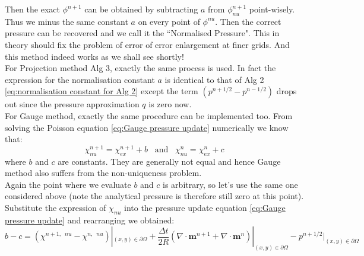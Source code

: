 Then the exact $\phi^{n+1}$ can be obtained by subtracting $a$ from $\phi^{n+1}_{nu}$ point-wisely. Thus we minus the same constant $a$ on every point of $\phi^{nu}$. Then the correct pressure can be recovered and we call it the ``Normalised Pressure". This in theory should fix the problem of error of error enlargement at finer grids. And this method indeed works as we shall see shortly!\\

For Projection method Alg 3, exactly the same process is used. In fact the expression for the normalisation constant $a$ is identical to that of Alg 2 \eqref{eq:normalisation constant for Alg 2} except the term $(p^{n+1/2} - p^{n-1/2})$ drops out since the pressure approximation $q$ is zero now.\\

For Gauge method, exactly the same procedure can be implemented too. From solving the Poisson equation \eqref{eq:Gauge pressure update} numerically we know that:
\begin{equation}
\chi^{n+1}_{nu} = \chi^{n+1}_{ex} + b\,\,\,\text{ and }\,\,\,\chi^{n}_{nu} = \chi^n_{ex} + c
\end{equation}
where $b$ and $c$ are constants. They are generally not equal and hence Gauge method also suffers from the non-uniqueness problem.\\

Again the point where we evaluate $b$ and $c$ is arbitrary, so let's use the same one considered above (note the analytical pressure is therefore still zero at this point).\\
Substitute the expression of $\chi_{nu}$ into the pressure update equation \eqref{eq:Gauge pressure update} and rearranging we obtained:
\begin{equation}
b - c = \left(\chi^{n+1,\,\,\,nu} - \chi^{n,\,\,\,nu}\right)|_{(x,y)\in \partial\Omega} + \dfrac{\Delta t}{2 R}\left(\nabla \cdot \textbf{m}^{n+1} + \nabla \cdot \textbf{m}^n \right)|_{(x,y)\in \partial\Omega} - p^{n+1/2}|_{(x,y)\in \partial\Omega}
\end{equation}

